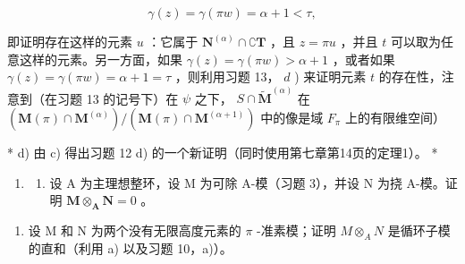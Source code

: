 \[
\gamma (z) = \gamma (\pi w) = \alpha + 1 <   \tau ,
\]

即证明存在这样的元素 \(u\) ：它属于 \(\mathbf{N}^{(\alpha)} \cap \complement \mathbf{T}\) ，且 \(z = \pi u\) ，并且 \(t\) 可以取为任意这样的元素。另一方面，如果 \(\gamma(z) = \gamma(\pi w) > \alpha + 1\) ，或者如果 \(\gamma(z) = \gamma(\pi w) = \alpha + 1 = \tau\) ，则利用习题 13， \(d\) ) 来证明元素 \(t\) 的存在性，注意到（在习题 13 的记号下）在 \(\psi\) 之下， \(S \cap \tilde{\mathbf{M}}^{(\alpha)}\) 在 \((\mathbf{M}(\pi) \cap \mathbf{M}^{(\alpha)}) / (\mathbf{M}(\pi) \cap \mathbf{M}^{(\alpha + 1)})\) 中的像是域 \(F_{\pi}\) 上的有限维空间）

* d) 由 c) 得出习题 12 d) 的一个新证明（同时使用第七章第14页的定理1）。 *

\begin{enumerate}
\def\labelenumi{\arabic{enumi})}
\setcounter{enumi}{14}
\tightlist
\item
  \begin{enumerate}
  \def\labelenumii{\alph{enumii})}
  \tightlist
  \item
    设 A 为主理想整环，设 M 为可除 A-模（习题 3），并设 N 为挠 A-模。证明 \(\mathbf{M} \otimes_{\mathbf{A}} \mathbf{N} = 0\) 。
  \end{enumerate}
\end{enumerate}

\begin{enumerate}
\def\labelenumi{\alph{enumi})}
\setcounter{enumi}{1}
\tightlist
\item
  设 M 和 N 为两个没有无限高度元素的 \(\pi\) -准素模；证明 \(M \otimes_{A} N\) 是循环子模的直和（利用 a) 以及习题 10，a)）。
\end{enumerate}

